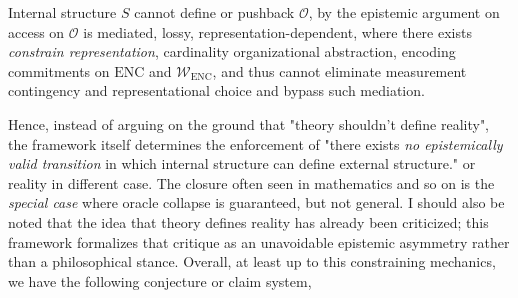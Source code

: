 \begin{conjecture}
	Internal structure $S$ cannot define or pushback $\mathcal{O}$, by the epistemic argument on access on $\mathcal{O}$ is mediated, lossy, representation-dependent, where there exists \textit{constrain representation}, cardinality organizational abstraction, encoding commitments on $\mathrm{ENC}$ and $\mathcal{W}_{\mathrm{ENC}}$, and thus cannot eliminate measurement contingency and representational choice and bypass such mediation.
\end{conjecture}
Hence, instead of arguing on the ground that "theory shouldn't define reality", the framework itself determines the enforcement of "there exists \textit{no epistemically valid transition} in which internal structure can define external structure." or reality in different case. The closure often seen in mathematics and so on is the \textit{special case} where oracle collapse is guaranteed, but not general. I should also be noted that the idea that theory defines reality has already been criticized; this framework formalizes that critique as an unavoidable epistemic asymmetry rather than a philosophical stance. Overall, at least up to this constraining mechanics, we have the following conjecture or claim system, 
